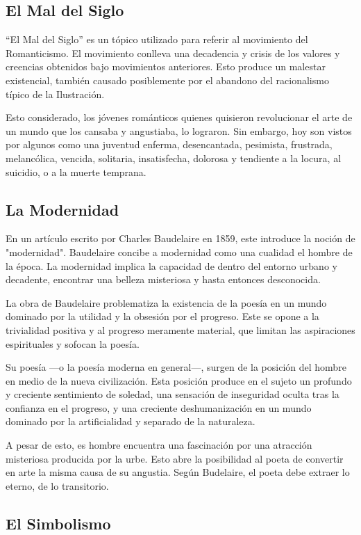 \documentclass{article}
\begin{document}
\subsection{El Mal del Siglo}

``El Mal del Siglo'' es un tópico utilizado para referir al movimiento del Romanticismo. El movimiento conlleva una decadencia y crisis de los valores y creencias obtenidos bajo movimientos anteriores. Esto produce un malestar existencial, también causado posiblemente por el abandono del racionalismo típico de la Ilustración.

Esto considerado, los jóvenes románticos quienes quisieron revolucionar el arte de un mundo que los cansaba y angustiaba, lo lograron. Sin embargo, hoy son vistos por algunos como una juventud enferma, desencantada, pesimista, frustrada, melancólica, vencida, solitaria, insatisfecha, dolorosa y tendiente a la locura, al
suicidio, o a la muerte temprana.

\subsection{La Modernidad}

En un artículo escrito por Charles Baudelaire en 1859, este introduce la noción de "modernidad". Baudelaire concibe a modernidad como una cualidad el hombre de la época. La modernidad implica la capacidad de dentro del entorno urbano y decadente, encontrar una belleza misteriosa y hasta entonces desconocida.

La obra de Baudelaire problematiza la existencia de la poesía en un mundo dominado por la utilidad y la obsesión por el progreso. Este se opone a la trivialidad positiva y al progreso meramente material, que limitan las aspiraciones espirituales y sofocan la poesía.

Su poesía ---o la poesía moderna en general---, surgen de la posición del hombre en medio de la nueva civilización. Esta posición produce en el sujeto un profundo y creciente sentimiento de soledad, una sensación de inseguridad oculta tras la confianza en el progreso, y una creciente deshumanización en un mundo dominado por la artificialidad y separado de la naturaleza.

A pesar de esto, es hombre encuentra una fascinación por una atracción misteriosa producida por la urbe. Esto abre la posibilidad al poeta de convertir en arte la misma causa de su angustia. Según Budelaire, el poeta debe extraer lo eterno, de lo transitorio.

\subsection{El Simbolismo}
\end{document}
